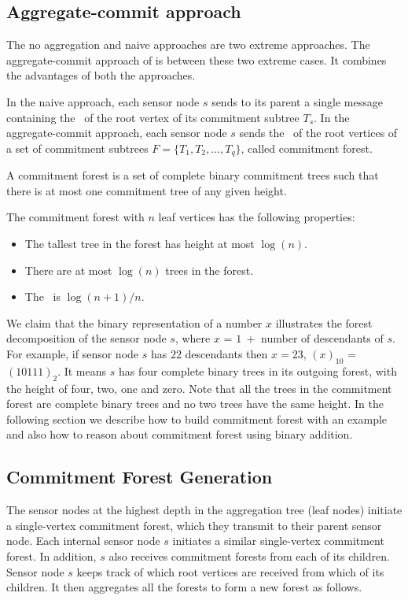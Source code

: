 	\subsection{Aggregate-commit approach}
		The no aggregation and naive approaches are two extreme approaches.
		The aggregate-commit approach of \cite{chan2006secure} is between these two extreme cases. It combines the advantages of both the approaches.

		In the naive approach, each sensor node $s$ sends to its parent a single message containing the \payload\ of the root vertex of its commitment subtree $T_{s}$.
		In the aggregate-commit approach, each sensor node $s$ sends the \payloads\ of the root vertices of a set of commitment subtrees $F = \{ T_{1},T_{2},\dotsc,T_{q} \} $, called commitment forest. 

		\begin{definition}\cite{chan2006secure}
			A commitment forest is a set of complete binary commitment trees such that there is	at most one commitment tree of any given height.
		\end{definition}
		The commitment forest with $n$ leaf vertices has the following properties:
		\begin{itemize}
			\item The tallest tree in the forest has height at most $\log(n)$.
			\item There are at most $\log(n)$ trees in the forest.
			\item The \inforate\ is $\log(n+1) / n$.
		\end{itemize}
		We claim that the binary representation of a number $x$ illustrates the forest decomposition of the sensor node $s$, where $x$ = $1\ +$ number of descendants of $s$.
		For example, if sensor node $s$ has $22$ descendants then $x =23$, $(x)_{10}$ = $(10111)_{2}$. 
		It means $s$ has four complete binary trees in its outgoing forest, with the height of four, two, one and zero.
		Note that all the trees in the commitment forest are complete binary trees and no two trees have the same height.
		In the following section we describe how to build commitment forest with an example and also how to reason about commitment forest using binary addition. 

	\subsection{Commitment Forest Generation}
		The sensor nodes at the highest depth in the aggregation tree (leaf nodes) initiate a single-vertex commitment forest, which they transmit to their parent sensor node.
		Each internal sensor node $s$ initiates a similar single-vertex commitment forest.
		In addition, $s$ also receives commitment 	forests from each of its children.
		Sensor node $s$ keeps track of which root vertices are received from which of its children.
		It then aggregates all the forests to form a new forest as follows.
		
